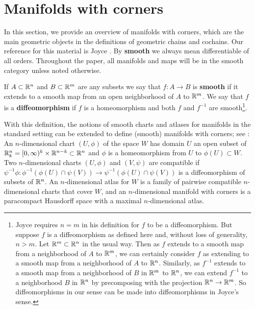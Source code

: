 
\section{Manifolds with corners}\label{S: manifolds with corners}

In this section, we provide an overview of manifolds with corners, which are the main geometric objects in the definitions of geometric chains and cochains.
Our reference for this material is Joyce \cite{Joy12}.
By \textbf{smooth} we always mean differentiable of all orders.
Throughout the paper, all manifolds and maps will be in the smooth category unless noted otherwise.

\begin{definition}
	If $A\subset \mathbb{R}^n$ and $B\subset \mathbb{R}^m$ are any subsets we say that $f \colon A\to B$ is \textbf{smooth} if it extends to a smooth map from an open neighborhood of $A$ to $\mathbb{R}^m$.
	We say that $f$ is a \textbf{diffeomorphism} if $f$ is a homeomorphism and both $f$ and $f^{-1}$ are smooth\footnote{Joyce requires $n=m$ in his definition for $f$ to be a diffeomorphism.
	But suppose $f$ is a diffeomorphism as defined here and, without loss of generality, $n>m$.
	Let $\mathbb{R}^m\subset \mathbb{R}^n$ in the usual way.
	Then as $f$ extends to a smooth map from a neighborhood of $A$ to $\mathbb{R}^m$, we can certainly consider $f$ as extending to a smooth map from a neighborhood of $A$ to $\mathbb{R}^n$.
	Similarly, as $f^{-1}$ extends to a smooth map from a neighborhood of $B$ in $\mathbb{R}^m$ to $\mathbb{R}^n$, we can extend $f^{-1}$ to a neighborhood $B$ in $\mathbb{R}^n$ by precomposing with the projection $\mathbb{R}^n\to \mathbb{R}^m$.
	So diffeomorphisms in our sense can be made into diffeomorphisms in Joyce's sense.}.
\end{definition}

With this definition, the notions of smooth charts and atlases for manifolds in the standard setting can be extended to define (smooth) manifolds with corners; see \cite[Section 2]{Joy12}: An $n$-dimensional chart $(U,\phi)$ of the space $W$ has domain $U$ an open subset of $\mathbb{R}^n_k = [0,\infty)^k \times \mathbb{R}^{n-k} \subset \mathbb{R}^n$ and $\phi$ is a homeomorphism from $U$ to $\phi(U)\subset W$.
Two $n$-dimensional charts $(U,\phi)$ and $(V,\psi)$ are compatible if $\psi^{-1}\phi \colon \phi^{-1}(\phi(U)\cap \psi(V))\to \psi^{-1}(\phi(U)\cap \psi(V))$ is a diffeomorphism of subsets of $\mathbb{R}^n$.
An $n$-dimensional atlas for $W$ is a family of pairwise compatible $n$-dimensional charts that cover $W$, and an $n$-dimensional manifold with corners is a paracompact Hausdorff space with a maximal $n$-dimensional atlas.

